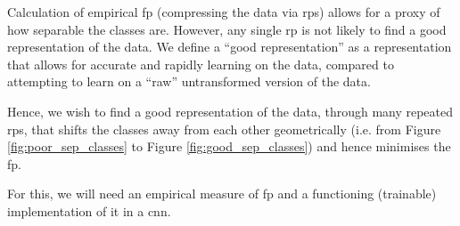 Calculation of empirical \gls{fp} (compressing the data via \gls{rp}s) allows for a proxy of how separable the classes are. However, any single \gls{rp} is not likely to find a good representation of the data. We define a \enquote{good representation} as a representation that allows for accurate and rapidly learning on the data, compared to attempting to learn on a \enquote{raw} untransformed version of the data.
\bigskip


Hence, we wish to find a good representation of the data, through many repeated  \gls{rp}s, that shifts the classes away from each other geometrically (i.e. from Figure \ref{fig:poor_sep_classes} to Figure \ref{fig:good_sep_classes}) and hence minimises the \gls{fp}. 
\bigskip

For this, we will need an empirical measure of \gls{fp} and a functioning (trainable) implementation of it in a \gls{cnn}. 
\bigskip

